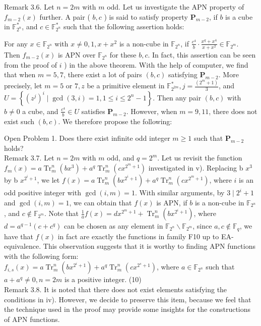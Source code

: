 \documentclass[10pt]{article}
\begin{document}
Remark 3.6. Let $n=2 m$ with $m$ odd. Let us investigate the APN property of $f_{m-2}(x)$ further. A pair ( $b, c$ ) is said to satisfy property $\mathbf{P}_{m-2}$, if $b$ is a cube in $\mathbb{F}_{2^{n}}^{*}$, and $c \in \mathbb{F}_{2^{n}}^{*}$ such that the following assertion holds:

For any $x \in \mathbb{F}_{2^{n}}$ with $x \neq 0,1, x+x^{2}$ is a non-cube in $\mathbb{F}_{2^{n}}$, if $\frac{c^{4}}{b} \cdot \frac{x^{q}+x^{4}}{x+x^{2}} \in \mathbb{F}_{2^{m}}$.\\
Then $f_{m-2}(x)$ is APN over $\mathbb{F}_{2^{n}}$ for these $b, c$. In fact, this assertion can be seen from the proof of $i$ ) in the above theorem. With the help of computer, we find that when $m=5,7$, there exist a lot of pairs $(b, c)$ satisfying $\mathbf{P}_{m-2}$. More precisely, let $m=5$ or $7, z$ be a primitive element in $\mathbb{F}_{2^{2 m}}^{*}, j=\frac{\left(2^{m}+1\right)}{3}$, and $U=\left\{\left(z^{j}\right)^{i} \mid \operatorname{gcd}(3, i)=1,1 \leq i \leq 2^{n}-1\right\}$. Then any pair $(b, c)$ with $b \neq 0$ a cube, and $\frac{c^{4}}{b} \in U$ satisfies $\mathbf{P}_{m-2}$. However, when $m=9,11$, there does not exist such $(b, c)$. We therefore propose the following:

Open Problem 1. Does there exist infinite odd integer $m \geq 1$ such that $\mathbf{P}_{m-2}$ holds?\\
Remark 3.7. Let $n=2 m$ with $m$ odd, and $q=2^{m}$. Let us revisit the function $f_{m}(x)=a \operatorname{Tr}_{m}^{n}\left(b x^{3}\right)+a^{q} \operatorname{Tr}_{m}^{n}\left(c x^{2^{m}+1}\right)$ investigated in v). Replacing b $x^{3}$ by b $x^{2^{i}+1}$, we let $f(x)=a \operatorname{Tr}_{m}^{n}\left(b x^{2^{i}+1}\right)+a^{q} \operatorname{Tr}_{m}^{n}\left(c x^{2^{m}+1}\right)$, where $i$ is an odd positive integer with $\operatorname{gcd}(i, m)=1$. With similar arguments, by $3 \mid 2^{i}+1$ and $\operatorname{gcd}(i, m)=1$, we can obtain that $f(x)$ is APN, if $b$ is a non-cube in $\mathbb{F}_{2^{n}}$, and $c \notin \mathbb{F}_{2^{m}}$. Note that $\frac{1}{a} f(x)=d x^{2^{m}+1}+\operatorname{Tr}_{m}^{n}\left(b x^{2^{i}+1}\right)$, where $d=a^{q-1}\left(c+c^{q}\right)$ can be chosen as any element in $\mathbb{F}_{2^{n}} \backslash \mathbb{F}_{2^{m}}$, since $a, c \notin \mathbb{F}_{q}$, we have that $f(x)$ in fact are exactly the functions in family F10 up to EA-equivalence. This observation suggests that it is worthy to finding APN functions with the following form:\\
$f_{i, s}(x)=a \operatorname{Tr}_{m}^{n}\left(b x^{2^{i}+1}\right)+a^{q} \operatorname{Tr}_{m}^{n}\left(c x^{2^{s}+1}\right)$, where $a \in \mathbb{F}_{2^{n}}$ such that $a+a^{q} \neq 0, n=2 m$ is a positive integer. (10)\\
Remark 3.8. It is noted that there does not exist elements satisfying the conditions in iv). However, we decide to preserve this item, because we feel that the technique used in the proof may provide some insights for the constructions of APN functions.
\end{document}
